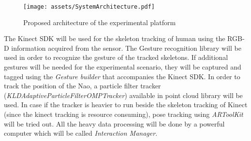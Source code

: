\begin{figure}
\centering
\texttt{[image: assets/SystemArchitecture.pdf]}
\caption{Proposed architecture of the experimental platform}
\label{fig:architecture}
\end{figure}
	The Kinect SDK will be used for the skeleton tracking of human using the RGB-D information acquired from the sensor. The Gesture recognition library will be used in order to recognize the gesture of the tracked skeletons. If additional gestures will be needed for the experimental scenario, they will be captured and tagged using the \emph{Gesture builder} that accompanies the Kinect SDK. In order to track the position of the Nao, a particle filter tracker (\emph{KLDAdaptiveParticleFilterOMPTracker}) available in point cloud library will be used. In case if the tracker is heavier to run beside the skeleton tracking of Kinect (since the kinect tracking is resource consuming), pose tracking using \emph{ARToolKit} will be tried out. All the heavy data processing will be done by a powerful computer which will be called \emph{Interaction Manager}. 

